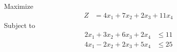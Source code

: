 \documentclass[12pt]{article}
\begin{document}
\subsection{}
Maximize
\begin{align*}
Z                           & = 4x_{1}+7x_{2}+2x_{3}+11x_{4}
\end{align*}
Subject to
\begin{align*}
2x_{1}+3x_{2}+6x_{3}+2x_{4} & \le 11                                                                                                                                                                          \\
4x_{1}-2x_{2}+2x_{3}+5x_{4} & \le 25                                                                                                                                                                          \\
\end{align*}
\end{document}

